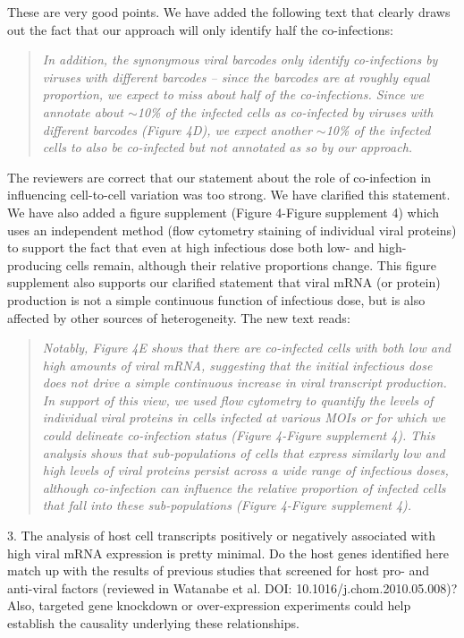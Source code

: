 \documentclass[11pt, oneside]{article}   	%
\begin{document}
{\color{black}
These are very good points.
We have added the following text that clearly draws out the fact that our approach will only identify half the co-infections:
\begin{quote}
\textsl{
In addition, the synonymous viral barcodes only identify co-infections by viruses with different barcodes -- since the barcodes are at roughly equal proportion, we expect to miss about half of the co-infections.
Since we annotate about $\sim$10\% of the infected cells as co-infected by viruses with different barcodes (Figure 4D), we expect another $\sim$10\% of the infected cells to also be co-infected but not annotated as so by our approach.
}
\end{quote}

The reviewers are correct that our statement about the role of co-infection in influencing cell-to-cell variation was too strong.
We have clarified this statement.
We have also added a figure supplement (Figure 4-Figure supplement 4) which uses an independent method (flow cytometry staining of individual viral proteins) to support the fact that even at high infectious dose both low- and high-producing cells remain, although their relative proportions change.
This figure supplement also supports our clarified statement that viral mRNA (or protein) production is not a simple continuous function of infectious dose, but is also affected by other sources of heterogeneity.
The new text reads:
\begin{quote}
\textsl{
Notably, Figure 4E shows that there are co-infected cells with both low and high amounts of viral mRNA, suggesting that the initial infectious dose does not drive a simple continuous increase in viral transcript production.
In support of this view, we used flow cytometry to quantify the levels of individual viral proteins in cells infected at various MOIs or for which we could delineate co-infection status (Figure 4-Figure supplement 4).
This analysis shows that sub-populations of cells that express similarly low and high levels of viral proteins persist across a wide range of infectious doses, although co-infection can influence the relative proportion of infected cells that fall into these sub-populations (Figure 4-Figure supplement 4).
}
\end{quote}
}

3. The analysis of host cell transcripts positively or negatively associated with high viral mRNA expression is pretty minimal. Do the host genes identified here match up with the results of previous studies that screened for host pro- and anti-viral factors (reviewed in Watanabe et al. DOI: 10.1016/j.chom.2010.05.008)? Also, targeted gene knockdown or over-expression experiments could help establish the causality underlying these relationships. 
\end{document}
